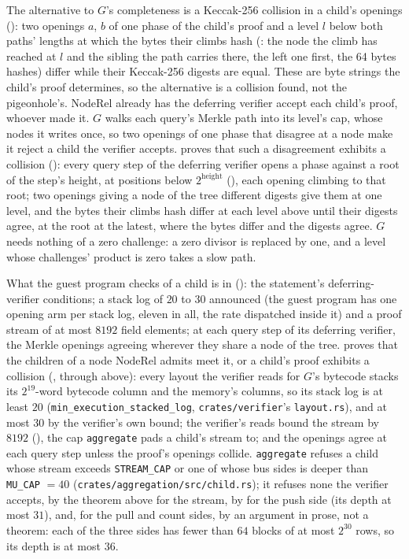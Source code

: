\documentclass[11pt]{article}
\begin{document}
The alternative to $G$'s completeness is a Keccak-256 collision in a child's openings (): two openings $a$, $b$ of one phase of the child's proof and a level $l$ below both paths' lengths at which the bytes their climbs hash (: the node the climb has reached at $l$ and the sibling the path carries there, the left one first, the 64 bytes  hashes) differ while their Keccak-256 digests are equal. These are byte strings the child's proof determines, so the alternative is a collision found, not the pigeonhole's. $\mathrm{NodeRel}$ already has the deferring verifier accept each child's proof, whoever made it. $G$ walks each query's Merkle path into its level's cap, whose nodes it writes once, so two openings of one phase that disagree at a node make it reject a child the verifier accepts.  proves that such a disagreement exhibits a collision (): every query step of the deferring verifier opens a phase against a root of the step's height, at positions below $2^{\text{height}}$ (), each opening climbing to that root; two openings giving a node of the tree different digests give them at one level, and the bytes their climbs hash differ at each level above until their digests agree, at the root at the latest, where the bytes differ and the digests agree. $G$ needs nothing of a zero challenge: a zero divisor is replaced by one, and a level whose challenges' product is zero takes a slow path.

What the guest program checks of a child is in  (): the statement's deferring-verifier conditions; a stack log of $20$ to $30$ announced (the guest program has one opening arm per stack log, eleven in all, the rate dispatched inside it) and a proof stream of at most $8192$ field elements; at each query step of its deferring verifier, the Merkle openings agreeing wherever they share a node of the tree.  proves that the children of a node $\mathrm{NodeRel}$ admits meet it, or a child's proof exhibits a collision (, through  above): every layout the verifier reads for $G$'s bytecode stacks its $2^{19}$-word bytecode column and the memory's columns, so its stack log is at least $20$ (\texttt{min\_execution\_stacked\_log}, \texttt{crates/verifier}'s \texttt{layout.rs}), and at most $30$ by the verifier's own bound; the verifier's reads bound the stream by $8192$ (), the cap \texttt{aggregate} pads a child's stream to; and the openings agree at each query step unless the proof's openings collide. \texttt{aggregate} refuses a child whose stream exceeds \texttt{STREAM\_CAP} or one of whose bus sides is deeper than \texttt{MU\_CAP} $= 40$ (\texttt{crates/aggregation/src/child.rs}); it refuses none the verifier accepts, by the theorem above for the stream, by  for the push side (its depth at most $31$), and, for the pull and count sides, by an argument in prose, not a theorem: each of the three sides has fewer than $64$ blocks of at most $2^{30}$ rows, so its depth is at most $36$.
\end{document}
